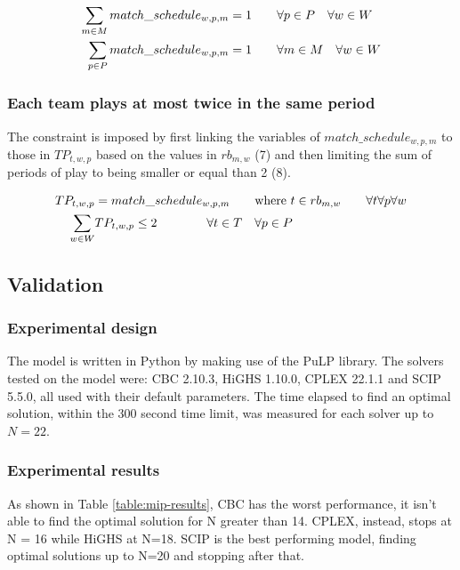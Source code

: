 \begin{align}
    \sum_{m \in M} match\_schedule_{w,p,m} &= 1 \hspace{20px} \forall p \in P \hspace{10px} \forall w \in W\\
    \sum_{p \in P} match\_schedule_{w,p,m} &= 1 \hspace{20px} \forall m \in M \hspace{10px}\forall w \in W
\end{align}

\subsubsection{Each team plays at most twice in the same period}
The constraint is imposed by first linking the variables of $match\_schedule_{w, p, m}$ to those in $TP_{t, w, p}$ based on the values in $rb_{m, w}$ (7) and then limiting the sum of periods of play to being smaller or equal than 2 (8). 

\begin{align}
    TP_{t,w,p} &= match\_schedule_{w,p,m} \hspace{20px} \text{where}\ t \in rb_{m, w} \hspace{20px} \forall t \forall p  \forall w\\
    \sum_{w \in W} &TP_{t,w,p} \leq 2 \hspace{40px} \forall t \in T \hspace{10px} \forall p \in P
\end{align}

\subsection{Validation}
\subsubsection*{Experimental design}
The model is written in Python by making use of the PuLP library. The solvers tested on the model were: CBC 2.10.3, HiGHS 1.10.0, CPLEX 22.1.1 and SCIP 5.5.0, all used with their default parameters. The time elapsed to find an optimal solution, within the 300 second time limit, was measured for each solver up to $N=22$.

\subsubsection*{Experimental results}
As shown in Table \ref{table:mip-results}, CBC has the worst performance, it isn't able to find the optimal solution for N greater than 14. CPLEX, instead, stops at N = 16 while HiGHS at N=18. SCIP is the best performing model, finding optimal solutions up to N=20 and stopping after that.

